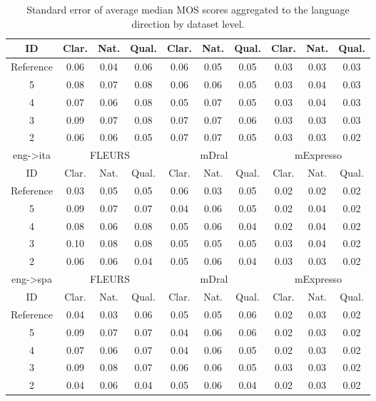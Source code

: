 \begin{table}[!ht]
\begin{tabular}{c|ccc|ccc|ccc}
\hline
ID & Clar. & Nat. & Qual. & Clar. & Nat. & Qual. & Clar. & Nat. & Qual. \\
\hline
Reference & 0.06 & 0.04 & 0.06 & 0.06 & 0.05 & 0.05 & 0.03 & 0.03 & 0.03\\
5 & 0.08 & 0.07 & 0.08 & 0.06 & 0.06 & 0.05 & 0.03 & 0.04 & 0.03\\
4 & 0.07 & 0.06 & 0.08 & 0.05 & 0.07 & 0.05 & 0.03 & 0.04 & 0.03\\
3 & 0.09 & 0.07 & 0.08 & 0.07 & 0.07 & 0.06 & 0.03 & 0.03 & 0.03\\
2 & 0.06 & 0.06 & 0.05 & 0.07 & 0.07 & 0.05 & 0.03 & 0.03 & 0.02\\
\hline
eng->ita & \multicolumn{3}{c|}{FLEURS} & \multicolumn{3}{c|}{mDral} & \multicolumn{3}{c|}{mExpresso}\\
\hline
ID & Clar. & Nat. & Qual. & Clar. & Nat. & Qual. & Clar. & Nat. & Qual. \\
\hline
Reference & 0.03 & 0.05 & 0.05 & 0.06 & 0.03 & 0.05 & 0.02 & 0.02 & 0.02\\
5 & 0.09 & 0.07 & 0.07 & 0.04 & 0.06 & 0.05 & 0.02 & 0.04 & 0.02\\
4 & 0.08 & 0.06 & 0.08 & 0.05 & 0.06 & 0.04 & 0.02 & 0.04 & 0.02\\
3 & 0.10 & 0.08 & 0.08 & 0.05 & 0.05 & 0.05 & 0.03 & 0.04 & 0.02\\
2 & 0.06 & 0.06 & 0.04 & 0.05 & 0.06 & 0.04 & 0.03 & 0.03 & 0.02\\
\hline
eng->spa & \multicolumn{3}{c|}{FLEURS} & \multicolumn{3}{c|}{mDral} & \multicolumn{3}{c|}{mExpresso}\\
\hline
ID & Clar. & Nat. & Qual. & Clar. & Nat. & Qual. & Clar. & Nat. & Qual. \\
\hline
Reference & 0.04 & 0.03 & 0.06 & 0.05 & 0.05 & 0.06 & 0.02 & 0.03 & 0.02\\
5 & 0.09 & 0.07 & 0.07 & 0.04 & 0.06 & 0.06 & 0.02 & 0.03 & 0.02\\
4 & 0.07 & 0.06 & 0.07 & 0.04 & 0.06 & 0.05 & 0.02 & 0.03 & 0.02\\
3 & 0.09 & 0.08 & 0.07 & 0.06 & 0.06 & 0.05 & 0.03 & 0.03 & 0.02\\
2 & 0.04 & 0.06 & 0.04 & 0.05 & 0.06 & 0.04 & 0.02 & 0.03 & 0.02\\
\hline
\end{tabular}
\caption{\label{tab:mos_human_evaluation_full_table_se} Standard error of average median MOS scores aggregated to the language direction by dataset level.}
\end{table}

